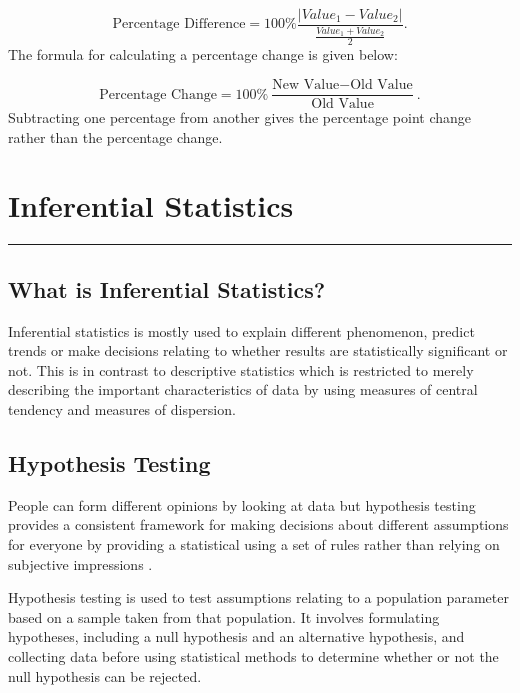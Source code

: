 \documentclass[
]{book}
\begin{document}
\[ \textrm{Percentage Difference} = 100\% \frac{|Value_1 - Value_2|}{\frac{Value_1+Value_2}{2}}.\]
The formula for calculating a percentage change is given below:

\[ \textrm{Percentage Change} = 100\% \frac{\textrm{New Value} - \textrm{Old Value}}{\textrm{Old Value}}.\]
Subtracting one percentage from another gives the percentage point change rather than the percentage change.

\hypertarget{infstat}{%
\chapter{Inferential Statistics}\label{infstat}}

\begin{center}\rule{0.5\linewidth}{0.5pt}\end{center}

\hypertarget{what-is-inferential-statistics}{%
\section{What is Inferential Statistics?}\label{what-is-inferential-statistics}}

Inferential statistics is mostly used to explain different phenomenon, predict trends or make decisions relating to whether results are statistically significant or not. This is in contrast to descriptive statistics which is restricted to merely describing the important characteristics of data by using measures of central tendency and measures of dispersion.

\hypertarget{hypothesis-testing}{%
\section{Hypothesis Testing}\label{hypothesis-testing}}

People can form different opinions by looking at data but hypothesis testing provides a consistent framework for making decisions about different assumptions for everyone by providing a statistical using a set of rules rather than relying on subjective impressions \citep{pereira}.

Hypothesis testing is used to test assumptions relating to a population parameter based on a sample taken from that population. It involves formulating hypotheses, including a null hypothesis and an alternative hypothesis, and collecting data before using statistical methods to determine whether or not the null hypothesis can be rejected.
\end{document}

